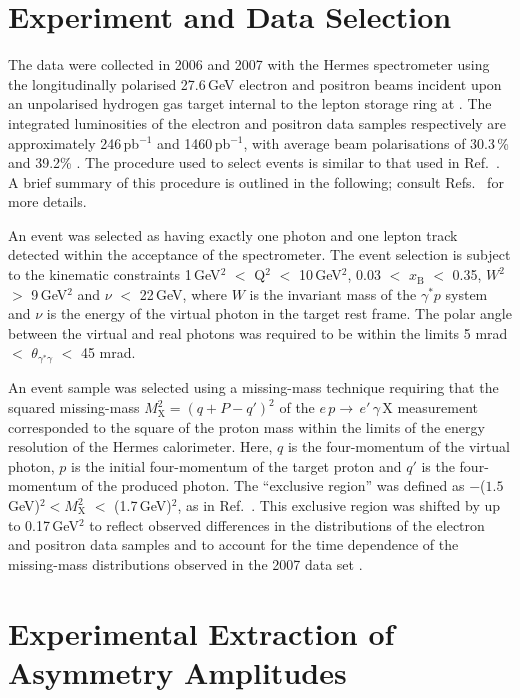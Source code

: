 \section{Experiment and Data Selection}
The data were collected in 2006 and 2007 with the H{\sc ermes}
spectrometer \cite{Ack98} using the longitudinally polarised 27.6\,GeV
electron and positron beams incident upon an unpolarised hydrogen gas
target internal to the  lepton storage ring at . The integrated
luminosities of the electron and positron data samples\red{,} respectively\red{,} are
approximately 246\,pb$^{-1}$ and 1460\,pb$^{-1}$, with average beam polarisations of 30.3\,\% and 39.2\% \cite{Ben01}. The procedure used to select events is similar to that used in Ref.~\cite{Air09}.
A brief summary of this procedure is outlined in the following; consult
Refs.~\cite{Zei09,Bur10} for more details. 

An event
was selected as having exactly one photon and one lepton
track detected within the acceptance of the spectrometer.
The event selection is subject to the kinematic constraints 1\,GeV$^{2}$ $<$
Q$^{2}$ $<$ 10\,GeV$^{2}$, 0.03 $<$ $x_{\textrm{B}}$ $<$ 0.35,
 $W^{2}$ $>$
9\,GeV$^{2}$ and $\nu$ $<$ 22\,GeV, where $W$ is the invariant mass of the
$\gamma^{*}p$ system and $\nu$ is the energy of the virtual photon in the target
rest frame. The polar angle between the virtual and real photons was required to
be within the limits 5 mrad $<$
$\theta_{\gamma^{*}\gamma}$ $<$ 45 mrad. 

An event sample was selected using a missing-mass technique requiring
that the squared missing-mass $M_{\textrm{X}}^{2}=(q+P-q')^{2}$
of the $e\,p \rightarrow\, e'\,\gamma\, \textrm{X}$ measurement
corresponded to the square of the proton mass within the limits of the
energy resolution of the H{\sc ermes} calorimeter. Here, $q$ is the four-momentum of the virtual photon, $p$ is the initial four-momentum of the target proton and $q'$ is the four-momentum of the produced photon. The ``exclusive region'' was defined as $-$($1.5$\,GeV)$^{2} < M_{\textrm{X}}^{2}$ $<$ (1.7\,GeV)$^{2}$, as in Ref.~\cite{Air09}. This exclusive region was shifted by up to 0.17\,GeV$^{2}$ to reflect observed differences in the distributions of the electron and positron data samples and to account for the time dependence of the missing-mass distributions observed in the 2007 data set \cite{Bur10}. 

\section{Experimental Extraction of Asymmetry Amplitudes}

